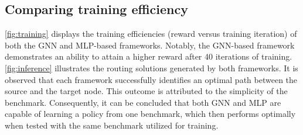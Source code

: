 \documentclass[letterpaper]{article}
\begin{document}
\subsection{Comparing training efficiency}
\autoref{fig:training} displays the training efficiencies (reward versus training iteration) of both the GNN and MLP-based frameworks. Notably, the GNN-based framework demonstrates an ability to attain a higher reward after 40 iterations of training. \autoref{fig:inference} illustrates the routing solutions generated by both frameworks. It is observed that each framework successfully identifies an optimal path between the source and the target node. This outcome is attributed to the simplicity of the benchmark. Consequently, it can be concluded that both GNN and MLP are capable of learning a policy from one benchmark, which then performs optimally when tested with the same benchmark utilized for training.
\end{document}
